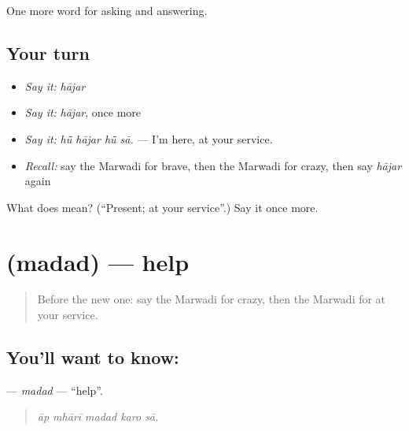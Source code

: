 \begin{grammarlens}[title={What you've built}]
One more word for asking and answering.
\end{grammarlens}

\subsection*{Your turn}
\begin{itemize}
\raggedright
  \item \emph{Say it:} \emph{hājar}
  \item \emph{Say it:} \emph{hājar}, once more
  \item \emph{Say it:} \emph{hū̃ hājar hū̃ sā.} — I'm here, at your service.
  \item \emph{Recall:} say the Marwadi for brave, then the Marwadi for crazy, then say \emph{hājar} again
\end{itemize}

\begin{tcolorbox}[breakable,colback=teal!4,colframe=teal!35!black,title={Before you move on}]
What does  mean? (\textquotedblleft{}Present; at your service\textquotedblright{}.) Say it once more.
\end{tcolorbox}
\section[\texorpdfstring{\mw{मदद} (madad)}{मदद (madad)}]{ (madad) — help}

\label{lesson:MW-C266-madad}



\begin{quote}
Before the new one: say the Marwadi for crazy, then the Marwadi for at your service.
\end{quote}

\subsection*{You'll want to know: }
\textbf{} — \emph{madad} — \textquotedblleft{}help\textquotedblright{}.

\begin{quote}
    
\end{quote}

\begin{quote}
\emph{āp mhārī madad karo sā.}
\end{quote}

